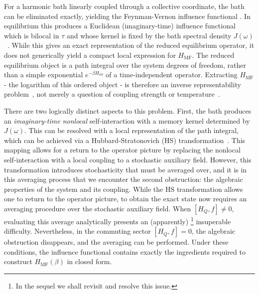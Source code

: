 \documentclass[aps,prl,twocolumn,superscriptaddress,showpacs,floatfix]{revtex4-2}
\begin{document}
For a harmonic bath linearly coupled through a collective coordinate, the bath
can be eliminated exactly, yielding the Feynman-Vernon influence functional
\cite{feynmanTheoryGeneralQuantum1963a, grabertQuantumBrownianMotion1988, ingoldSpecificHeatAnomalies2009, hanggiFiniteQuantumDissipation2008}.
In equilibrium this produces a Euclidean (imaginary-time) influence functional
which is bilocal in $\tau$ and whose kernel is fixed by the bath spectral
density $J(\omega)$~\cite{moixEquilibriumreducedDensityMatrix2012, mccaulPartitionfreeApproachOpen2017c, mccaulDrivingSpinbosonModels2018a, mccaulHowWinFriends2021b}. While this gives an exact representation of the reduced equilibrium operator, it does not generically yield a compact local expression for $H_{\mathrm{MF}}$. The reduced equilibrium object is a path integral over the system degrees of freedom, rather than a
simple exponential $e^{-\beta H_{\mathrm{eff}}}$ of a time-independent operator.
Extracting $H_{\mathrm{MF}}$ - the logarithm of this ordered object - is
therefore an inverse representability problem~\cite{ColemanYukalov2000RDM,Mazziotti2007RDMMechanics,LiuChristandlVerstraete2007NRepQMA,Klyachko2006QuantumMarginal}, not merely a question of coupling
strength or temperature~\cite{talknerColloquiumStatisticalMechanics2020, hovhannisyanHamiltonianMeanForce2020}.

There are two logically distinct aspects to this problem. First, the bath produces an \emph{imaginary-time nonlocal} self-interaction with a memory kernel determined by $J(\omega)$. This can be resolved with a local representation of the path integral, which can be achieved via a Hubbard-Stratonovich (HS) transformation~\cite{hubbardCalculationPartitionFunctions1959a, stratonovich1957QDistro}. This mapping allows for a return to the operator picture by replacing the nonlocal self-interaction with a local coupling to a stochastic auxiliary field. However, this transformation introduces stochasticity that must be averaged over, and it is in this averaging process that we encounter the second obstruction: the algebraic properties of the system and its coupling. While the HS transformation allows one to return to the operator picture, to obtain the exact state now requires an averaging procedure over the stochastic auxiliary field. When $[H_Q,f]\neq 0$, evaluating this average analytically presents an (apparently) \footnote{In the sequel we shall revisit and resolve this issue.} insuperable difficulty. Nevertheless, in the commuting sector $[H_Q,f]=0$, the algebraic obstruction disappears, and the averaging can be performed. Under these conditions, the influence functional contains exactly the ingredients required to construct $H_{\mathrm{MF}}(\beta)$ in closed form.
\end{document}
